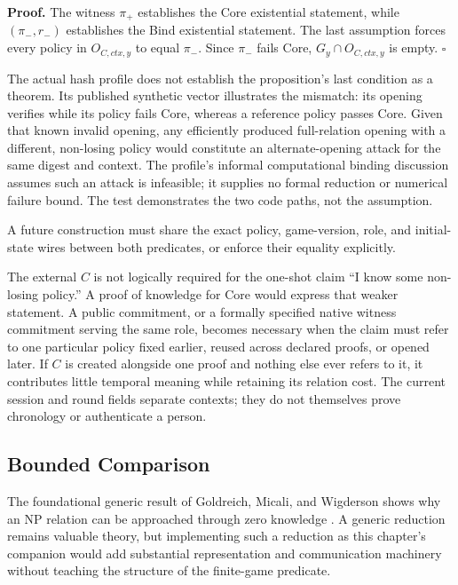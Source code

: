 \textbf{Proof.}
The witness $\pi_+$ establishes the Core existential statement, while
$(\pi_-,r_-)$ establishes the Bind existential statement. The last assumption
forces every policy in $O_{C,\mathit{ctx},y}$ to equal $\pi_-$. Since
$\pi_-$ fails Core, $G_y\cap O_{C,\mathit{ctx},y}$ is empty. $\square$

The actual hash profile does not establish the proposition's last condition as
a theorem. Its published synthetic vector illustrates the mismatch: its
opening verifies while its policy fails Core, whereas a reference policy
passes Core. Given that known invalid opening, any efficiently produced
full-relation opening with a different, non-losing policy would constitute an
alternate-opening attack for the same digest and context. The profile's
informal computational binding discussion assumes such an attack is
infeasible; it supplies no formal reduction or numerical failure bound. The
test demonstrates the two code paths, not the assumption.

A future construction must share the exact policy, game-version, role, and
initial-state wires between both predicates, or enforce their equality
explicitly.

The external $C$ is not logically required for the one-shot claim ``I know
some non-losing policy.'' A proof of knowledge for Core would express that
weaker statement. A public commitment, or a formally specified native witness
commitment serving the same role, becomes necessary when the claim must refer
to one particular policy fixed earlier, reused across declared proofs, or
opened later. If $C$ is created alongside one proof and nothing else ever
refers to it, it contributes little temporal meaning while retaining its
relation cost. The current session and round fields separate contexts; they do
not themselves prove chronology or authenticate a person.

\subsection{Bounded Comparison}

The foundational generic result of Goldreich, Micali, and Wigderson shows why
an NP relation can be approached through zero knowledge
\cite{goldreich1991proofsvalidity}. A generic reduction remains valuable
theory, but implementing such a reduction as this chapter's companion would
add substantial representation and communication machinery without teaching
the structure of the finite-game predicate.

